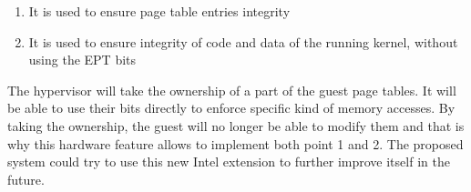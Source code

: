 \begin{enumerate}
    \item It is used to ensure page table entries integrity
    \item It is used to ensure integrity of code and data of the running kernel, without using the EPT bits
\end{enumerate}
The hypervisor will take the ownership of a part of the guest page tables. It will be able to use their bits directly to enforce specific kind of memory accesses. By taking the ownership, the guest will no longer be able to modify them and that is why this hardware feature allows to implement both point 1 and 2. The proposed system could try to use this new Intel extension to further improve itself in the future.




